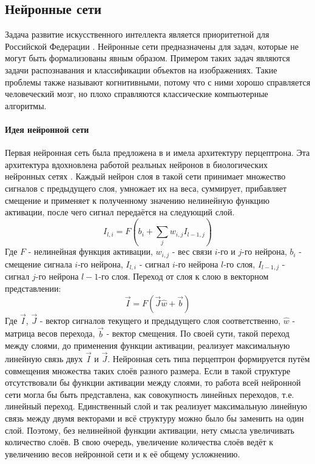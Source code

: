 \subsection{Нейронные сети}\label{sec:ANN}
Задача развитие искусственного интеллекта является приоритетной для Российской Федерации \cite{Russia}. Нейронные сети предназначены для задач, которые не могут быть формализованы явным образом. Примером таких задач являются задачи распознавания и классификации объектов на изображениях. Такие проблемы также называют когнитивными, потому что с ними хорошо справляется человеческий мозг, но плохо справляются классические компьютерные алгоритмы.

\paragraph{Идея нейронной сети}
Первая нейронная сеть была предложена в \cite{rosenblatt1958perceptron} и имела архитектуру перцептрона. Эта архитектура вдохновлена работой реальных нейронов в биологических нейронных сетях \cite{block1962perceptron}. Каждый нейрон слоя в такой сети принимает множество сигналов с предыдущего слоя, умножает их на веса, суммирует, прибавляет смещение и применяет к полученному значению нелинейную функцию активации, после чего сигнал передаётся на следующий слой.
\begin{equation}\label{eq:per1}
	I_{l,i}=F\left(b_i+\sum\limits_{j}{w_{i,j}I_{l-1,j}}\right)
\end{equation}
Где $F$ - нелинейная функция активации, $w_{i,j}$ - вес связи $i$-го и $j$-го нейрона, $b_i$ - смещение сигнала $i$-го нейрона, $I_{l,i}$ - сигнал $i$-го нейрона $l$-го слоя, $I_{l-1,j}$ - сигнал $j$-го нейрона $l-1$-го слоя. Переход от слоя к слою в векторном представлении:
\begin{equation}\label{eq:per2}
	\vec{I} = F\left(\vec{J}\hat{w} + \vec{b}\right)
\end{equation}
Где $\vec{I}$, $\vec{J}$ - вектор сигналов текущего и предыдущего слоя соответственно, $\hat{w}$ - матрица весов перехода, $\vec{b}$ - вектор смещения. По своей сути, такой переход между слоями, до применения функции активации, реализует максимальную линейную связь двух $\vec{I}$ и $\vec{J}$. Нейронная сеть типа перцептрон формируется путём совмещения множества таких слоёв разного размера. Если в такой структуре отсутствовали бы функции активации между слоями, то работа всей нейронной сети могла бы быть представлена, как совокупность линейных переходов, т.е. линейный переход. Единственный слой и так реализует максимальную линейную связь между двумя векторами и всё структуру можно было бы заменить на один слой. Поэтому, без нелинейной функции активации, нету смысла увеличивать количество слоёв. В свою очередь, увеличение количества слоёв ведёт к увеличению весов нейронной сети и к её общему усложнению.
